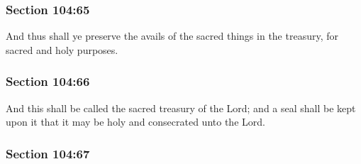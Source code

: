 
	\subsubsection{Section 104:65} %
		\label{DC104-65}

		And thus shall ye preserve the avails of the sacred things in the treasury, for sacred and holy purposes.


	\subsubsection{Section 104:66} %
		\label{DC104-66}

		And this shall be called the sacred treasury of the Lord; and a seal shall be kept upon it that it may be holy and consecrated unto the Lord.


	\subsubsection{Section 104:67} %
		\label{DC104-67}

